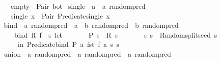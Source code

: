 \begin{isabellebody}
\ \ \ {\isachardoublequoteopen}empty\ {\isacharequal}{\kern0pt}\ Pair\ bot{\isachardoublequoteclose}\isanewline
\isanewline
{}\isamarkupfalse%
\ single\ {\isacharcolon}{\kern0pt}{\isacharcolon}{\kern0pt}\ {\isachardoublequoteopen}{\isacharprime}{\kern0pt}a\ {\isacharequal}{\kern0pt}{\isachargreater}{\kern0pt}\ {\isacharprime}{\kern0pt}a\ random{\isacharunderscore}{\kern0pt}pred{\isachardoublequoteclose}\isanewline
\ \ \ {\isachardoublequoteopen}single\ x\ {\isacharequal}{\kern0pt}\ Pair\ {\isacharparenleft}{\kern0pt}Predicate{\isachardot}{\kern0pt}single\ x{\isacharparenright}{\kern0pt}{\isachardoublequoteclose}\isanewline
\isanewline
{}\isamarkupfalse%
\ bind\ {\isacharcolon}{\kern0pt}{\isacharcolon}{\kern0pt}\ {\isachardoublequoteopen}{\isacharprime}{\kern0pt}a\ random{\isacharunderscore}{\kern0pt}pred\ {\isasymRightarrow}\ {\isacharparenleft}{\kern0pt}{\isacharprime}{\kern0pt}a\ {\isasymRightarrow}\ {\isacharprime}{\kern0pt}b\ random{\isacharunderscore}{\kern0pt}pred{\isacharparenright}{\kern0pt}\ {\isasymRightarrow}\ {\isacharprime}{\kern0pt}b\ random{\isacharunderscore}{\kern0pt}pred{\isachardoublequoteclose}\isanewline
\ \ \isanewline
\ \ \ \ {\isachardoublequoteopen}bind\ R\ f\ {\isacharequal}{\kern0pt}\ {\isacharparenleft}{\kern0pt}{\isasymlambda}s{\isachardot}{\kern0pt}\ let\isanewline
\ \ \ \ \ \ \ {\isacharparenleft}{\kern0pt}P{\isacharcomma}{\kern0pt}\ s{\isacharprime}{\kern0pt}{\isacharparenright}{\kern0pt}\ {\isacharequal}{\kern0pt}\ R\ s{\isacharsemicolon}{\kern0pt}\isanewline
\ \ \ \ \ \ \ {\isacharparenleft}{\kern0pt}s{}{\isacharcomma}{\kern0pt}\ s{}{\isacharparenright}{\kern0pt}\ {\isacharequal}{\kern0pt}\ Random{\isachardot}{\kern0pt}split{\isacharunderscore}{\kern0pt}seed\ s{\isacharprime}{\kern0pt}\isanewline
\ \ \ \ \ in\ {\isacharparenleft}{\kern0pt}Predicate{\isachardot}{\kern0pt}bind\ P\ {\isacharparenleft}{\kern0pt}{\isacharpercent}{\kern0pt}a{\isachardot}{\kern0pt}\ fst\ {\isacharparenleft}{\kern0pt}f\ a\ s{}{\isacharparenright}{\kern0pt}{\isacharparenright}{\kern0pt}{\isacharcomma}{\kern0pt}\ s{}{\isacharparenright}{\kern0pt}{\isacharparenright}{\kern0pt}{\isachardoublequoteclose}\isanewline
\isanewline
{}\isamarkupfalse%
\ union\ {\isacharcolon}{\kern0pt}{\isacharcolon}{\kern0pt}\ {\isachardoublequoteopen}{\isacharprime}{\kern0pt}a\ random{\isacharunderscore}{\kern0pt}pred\ {\isasymRightarrow}\ {\isacharprime}{\kern0pt}a\ random{\isacharunderscore}{\kern0pt}pred\ {\isasymRightarrow}\ {\isacharprime}{\kern0pt}a\ random{\isacharunderscore}{\kern0pt}pred{\isachardoublequoteclose}\isanewline

\end{isabellebody}
